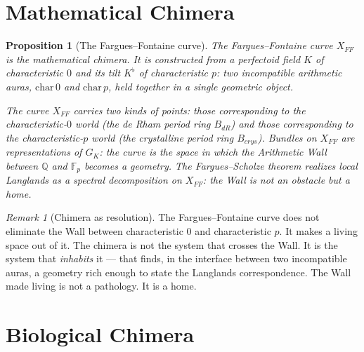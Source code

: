 \documentclass[12pt]{article}
\newtheorem{proposition}[theorem]{Proposition}
\theoremstyle{definition}
\theoremstyle{remark}
\newtheorem{remark}[theorem]{Remark}
\begin{document}
\section{Mathematical Chimera}

\begin{proposition}[The Fargues--Fontaine curve]
The Fargues--Fontaine curve $X_{FF}$ \cite{perfectoid}
is the mathematical chimera.
It is constructed from a perfectoid field $K$ of characteristic $0$
and its tilt $K^\flat$ of characteristic $p$:
two incompatible arithmetic auras, $\mathrm{char}\,0$ and $\mathrm{char}\,p$,
held together in a single geometric object.

The curve $X_{FF}$ carries two kinds of points:
those corresponding to the characteristic-$0$ world
(the de Rham period ring $B_{dR}$)
and those corresponding to the characteristic-$p$ world
(the crystalline period ring $B_{crys}$).
Bundles on $X_{FF}$ are representations of $G_K$:
the curve is the space in which the Arithmetic Wall
between $\mathbb{Q}$ and $\mathbb{F}_p$ becomes a geometry.
The Fargues--Scholze theorem \cite{perfectoid} realizes
local Langlands as a spectral decomposition on $X_{FF}$:
the Wall is not an obstacle but a home.
\end{proposition}

\begin{remark}[Chimera as resolution]
The Fargues--Fontaine curve does not eliminate the Wall
between characteristic $0$ and characteristic $p$.
It makes a living space out of it.
The chimera is not the system that crosses the Wall.
It is the system that \emph{inhabits} it ---
that finds, in the interface between two incompatible auras,
a geometry rich enough to state the Langlands correspondence.
The Wall made living is not a pathology. It is a home.
\end{remark}

\section{Biological Chimera}
\end{document}
